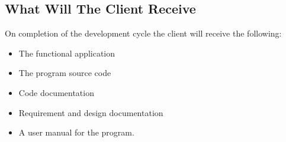 \subsection{What Will The Client Receive}
On completion of the development cycle the client will receive the following:
\begin{itemize}
\item The functional application
\item The program source code
\item Code documentation
\item Requirement and design documentation
\item A user manual for the program.
\end{itemize}
